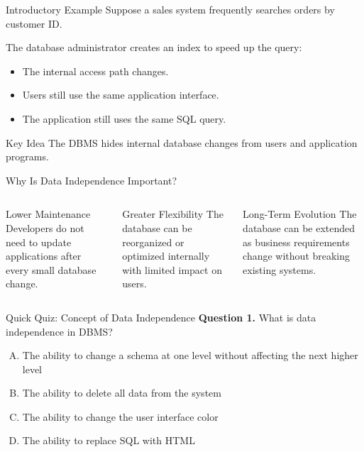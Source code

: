 \documentclass[aspectratio=169,11pt]{beamer}
\begin{document}
\begin{frame}{Introductory Example}
Suppose a sales system frequently searches orders by customer ID.

\vspace{0.3cm}
The database administrator creates an index to speed up the query:
\begin{itemize}
  \item The internal access path changes.
  \item Users still use the same application interface.
  \item The application still uses the same SQL query.
\end{itemize}

\begin{alertblock}{Key Idea}
The DBMS hides internal database changes from users and application programs.
\end{alertblock}
\end{frame}

\begin{frame}{Why Is Data Independence Important?}
\begin{columns}[T]
\begin{block}{Lower Maintenance}
Developers do not need to update applications after every small database change.
\end{block}

\begin{block}{Greater Flexibility}
The database can be reorganized or optimized internally with limited impact on users.
\end{block}

\begin{block}{Long-Term Evolution}
The database can be extended as business requirements change without breaking existing systems.
\end{block}
\end{columns}
\end{frame}

\begin{frame}{Quick Quiz: Concept of Data Independence}
\textbf{Question 1.} What is data independence in DBMS?
\begin{enumerate}[A.]
  \item The ability to change a schema at one level without affecting the next higher level
  \item The ability to delete all data from the system
  \item The ability to change the user interface color
  \item The ability to replace SQL with HTML
\end{enumerate}
\end{frame}
\end{document}
